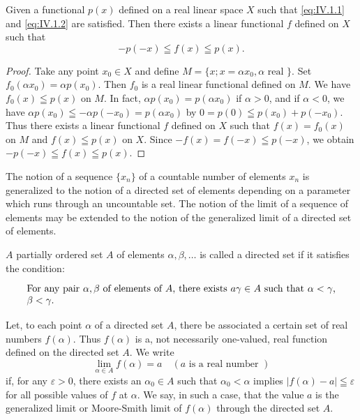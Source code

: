\begin{corollaryu} Given a functional $p(x)$ defined on a real linear space $X$ such that \eqref{eq:IV.1.1} and \eqref{eq:IV.1.2} are satisfied. Then there exists a linear functional $f$ defined on $X$ such that 
\begin{equation}\label{eq:IV.1.4}
- p (- x) \leqq f (x) \leqq p (x).
\end{equation}
\end{corollaryu}

\begin{proof}
 Take any point $x_0 \in X$ and define $M = \{x; x = \alpha x_0, \alpha \text{ real }\}$. Set $f_0(\alpha x_0) = \alpha p(x_0)$. Then $f_0$ is a real linear functional defined on $M$. We have $f_0(x) \leqq p(x)$ on $M$. In fact, $\alpha p(x_0) = p(\alpha x_0)$ if $\alpha > 0$, and if $\alpha < 0$, we have $\alpha p(x_0) \leqq -\alpha p(-x_0) = p(\alpha x_0)$ by $0 = p(0) \leqq p(x_0) + p(-x_0)$. Thus there exists a linear functional $f$ defined on $X$ such that $f(x) = f_0(x)$ on $M$ and $f(x) \leqq p(x)$ on $X$. Since $-f(x) = f(-x) \leqq p(-x)$, we obtain $-p(-x) \leqq f(x) \leqq p(x)$. 
\end{proof}


\label{sec:IV.2}

The notion of a sequence $\{x_{n}\}$ of a countable number of elements $x_{n}$ is generalized to the notion of a directed set of elements depending on a parameter which runs through an uncountable set. The notion of the limit of a sequence of elements may be extended to the notion of the generalized limit of a directed set of elements. 

\begin{definitionu} $A$ partially ordered set $A$ of elements $\alpha, \beta, \ldots$ is called a directed set if it satisfies the condition: 

\begin{equation}\label{eq:IV.2.1}
\begin{minipage}[b]{0.92\linewidth}
For any pair $\alpha, \beta$ of elements of $A$, there exists $a\gamma \in A$ such that $\alpha < \gamma$, $\beta < \gamma$.
\end{minipage}
\end{equation}
\end{definitionu}


Let, to each point $\alpha$ of a directed set $A$, there be associated a certain set of real numbers $f(\alpha)$. Thus $f(\alpha)$ is a, not necessarily one-valued, real function defined on the directed set $A$. We write 
\[
\lim\limits _{\alpha \in A} f (\alpha) = a \quad (a \text{ is a real number })
\]
if, for any $\varepsilon > 0$, there exists an $\alpha_0 \in A$ such that $\alpha_0 < \alpha$ implies $|f(\alpha) - a| \leqq \varepsilon$ for all possible values of $f$ at $\alpha$. We say, in such a case, that the value $a$ is the generalized limit or Moore-Smith limit of $f(\alpha)$ through the directed set $A$. 


